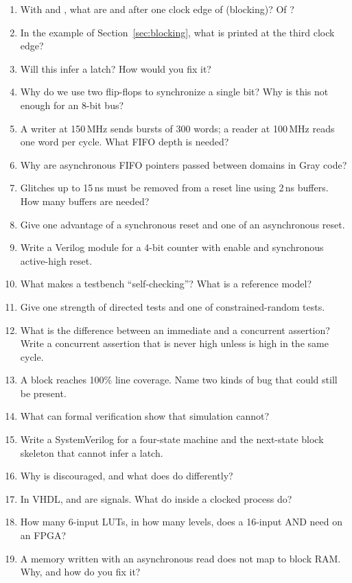 \begin{enumerate}
  \item With  and , what are  and  after one clock edge of  (blocking)? Of ?
  \item In the  example of Section~\ref{sec:blocking}, what is printed at the third clock edge?
  \item Will this infer a latch?  How would you fix it?
  \item Why do we use two flip-flops to synchronize a single bit? Why is this not enough for an 8-bit bus?
  \item A writer at 150\,MHz sends bursts of 300 words; a reader at 100\,MHz reads one word per cycle. What FIFO depth is needed?
  \item Why are asynchronous FIFO pointers passed between domains in Gray code?
  \item Glitches up to 15\,ns must be removed from a reset line using 2\,ns buffers. How many buffers are needed?
  \item Give one advantage of a synchronous reset and one of an asynchronous reset.
  \item Write a Verilog module for a 4-bit counter with enable and synchronous active-high reset.
  \item What makes a testbench ``self-checking''? What is a reference model?
  \item Give one strength of directed tests and one of constrained-random tests.
  \item What is the difference between an immediate and a concurrent assertion? Write a concurrent assertion that  is never high unless  is high in the same cycle.
  \item A block reaches 100\% line coverage. Name two kinds of bug that could still be present.
  \item What can formal verification show that simulation cannot?
  \item Write a SystemVerilog  for a four-state machine and the  next-state block skeleton that cannot infer a latch.
  \item Why is  discouraged, and what does  do differently?
  \item In VHDL,  and  are signals. What do  inside a clocked process do?
  \item How many 6-input LUTs, in how many levels, does a 16-input AND need on an FPGA?
  \item A memory written with an asynchronous read does not map to block RAM. Why, and how do you fix it?
\end{enumerate}

